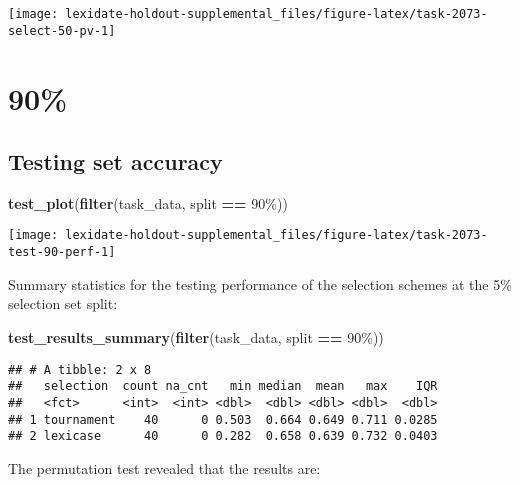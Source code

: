 \documentclass[
]{book}
\newenvironment{Shaded}{\begin{snugshade}}{\end{snugshade}}
\newcommand{\FunctionTok}[1]{\textcolor[rgb]{0.13,0.29,0.53}{\textbf{#1}}}
\newcommand{\NormalTok}[1]{#1}
\newcommand{\SpecialCharTok}[1]{\textcolor[rgb]{0.81,0.36,0.00}{\textbf{#1}}}
\newcommand{\StringTok}[1]{\textcolor[rgb]{0.31,0.60,0.02}{#1}}
\begin{document}
\texttt{[image: lexidate-holdout-supplemental\_files/figure-latex/task-2073-select-50-pv-1]}

\hypertarget{section-43}{%
\section{90\%}\label{section-43}}

\hypertarget{testing-set-accuracy-43}{%
\subsection{Testing set accuracy}\label{testing-set-accuracy-43}}

\begin{Shaded}
\begin{Highlighting}[]
\FunctionTok{test\_plot}\NormalTok{(}\FunctionTok{filter}\NormalTok{(task\_data, split }\SpecialCharTok{==} \StringTok{\textquotesingle{}90\%\textquotesingle{}}\NormalTok{))}
\end{Highlighting}
\end{Shaded}

\texttt{[image: lexidate-holdout-supplemental\_files/figure-latex/task-2073-test-90-perf-1]}

Summary statistics for the testing performance of the selection schemes at the 5\% selection set split:

\begin{Shaded}
\begin{Highlighting}[]
\FunctionTok{test\_results\_summary}\NormalTok{(}\FunctionTok{filter}\NormalTok{(task\_data, split }\SpecialCharTok{==} \StringTok{\textquotesingle{}90\%\textquotesingle{}}\NormalTok{))}
\end{Highlighting}
\end{Shaded}

\begin{verbatim}
## # A tibble: 2 x 8
##   selection  count na_cnt   min median  mean   max    IQR
##   <fct>      <int>  <int> <dbl>  <dbl> <dbl> <dbl>  <dbl>
## 1 tournament    40      0 0.503  0.664 0.649 0.711 0.0285
## 2 lexicase      40      0 0.282  0.658 0.639 0.732 0.0403
\end{verbatim}

The permutation test revealed that the results are:
\end{document}
